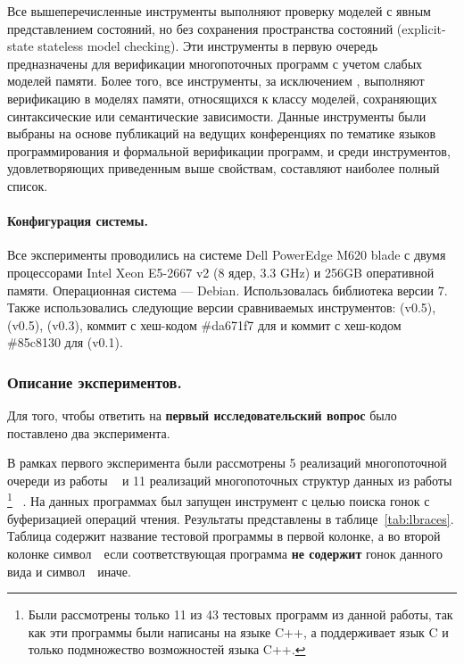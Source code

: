Все вышеперечисленные инструменты выполняют проверку 
моделей с явным представлением состояний, 
но без сохранения пространства состояний (explicit-state stateless model checking). 
Эти инструменты в первую очередь предназначены 
для верификации многопоточных программ с учетом слабых моделей памяти. 
Более того, все инструменты, за исключением \genmc, выполняют верификацию 
в моделях памяти, относящихся к классу моделей, 
сохраняющих синтаксические или семантические зависимости. 
Данные инструменты были выбраны на основе публикаций 
на ведущих конференциях по тематике языков программирования 
и формальной верификации программ, и среди инструментов, 
удовлетворяющих приведенным выше свойствам, 
составляют наиболее полный список.

\paragraph{Конфигурация системы.} 

Все эксперименты проводились на системе Dell PowerEdge M620 blade
с двумя процессорами Intel Xeon E5-2667 v2 (8 ядер, 3.3 GHz)
и 256GB оперативной памяти. Операционная система --- Debian.
Использовалась библиотека \LLVM версии 7.
Также использовались следующие версии сравниваемых инструментов: 
\hmc (v0.5), \genmc (v0.5), \Nidhugg (v0.3), 
коммит с хеш-кодом \#da671f7 для \CDSChecker
и коммит с хеш-кодом \#85c8130 для \rmem (v0.1). 

\subsubsection*{Описание экспериментов.} 

Для того, чтобы ответить на \textbf{первый исследовательский вопрос} 
было поставлено два эксперимента. 

В рамках первого эксперимента были рассмотрены 
5 реализаций многопоточной очереди из работы%
~\cite{Kokologiannakis:PLDI2019}
и 11 реализаций многопоточных структур данных из работы%
\footnote{Были рассмотрены только 11 из 43 
тестовых программ из данной работы, 
так как эти программы были написаны на языке C++,
а \genmc поддерживает язык C и только подмножество возможностей языка C++.}
~\cite{Ou-Demsky:OOPSLA18}.
На данных программах был запущен инструмент \wmc с целью 
поиска гонок с буферизацией операций чтения.
Результаты представлены в таблице~\ref{tab:lbraces}.
Таблица содержит название тестовой программы в первой колонке, 
а во второй колонке символ~\cmark~если соответствующая 
программа \textbf{не содержит} гонок данного вида 
и символ~\xmark~иначе.

